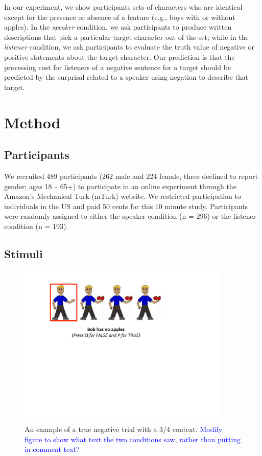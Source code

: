 \documentclass[man, noapacite]{apa2}
\begin{document}
In our experiment, we show participants sets of characters who are identical except for the presence or absence of a feature (e.g., boys with or without apples). In the \emph{speaker} condition, we ask participants to produce written descriptions that pick a particular target character out of the set; while in the \emph{listener} condition, we ask participants to evaluate the truth value of negative or positive statements about the target character. Our prediction is that the processing cost for listeners of a negative sentence for a target should be predicted by the surprisal \cite{levy2008} related to a speaker using negation to describe that target.

\section{Method}

\subsection{Participants} 

We recruited 489 participants (262 male and 224 female, three declined to report gender; ages 18 -- 65+) to participate in an online experiment through the Amazon's Mechanical Turk (mTurk) website.  We restricted participation to individuals in the US and paid 50 cents for this 10 minute study.  Participants were randomly assigned to either the speaker condition (n = 296) or the listener condition (n = 193).

\subsection{Stimuli}

\begin{figure}[t]
\begin{center} 
\includegraphics[width=4in]{figures/trialfig.pdf}
\caption{\label{fig:trial} An example of a true negative trial with a 3/4 context. \textcolor{blue}{Modify figure to show what text the two conditions saw, rather than putting in comment text?}}
\vspace{-5mm}
\end{center} 
\end{figure}
\end{document}

